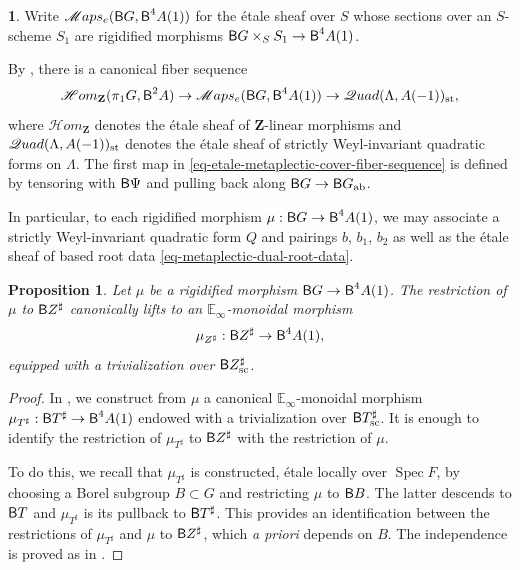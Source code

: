 \documentclass[10pt,english,reqno]{amsart}
\newcommand{\integers}{\mathbf Z}
\newcommand{\SMaps}{\mathscr{M}aps}
\newcommand{\SHom}{\mathscr{H}om}
\newcommand{\deloop}{\textnormal{\textsf{B}}}
\newcommand{\Spec}{\operatorname{Spec}}
\newcommand{\sconn}{\textnormal{sc}}
\newcommand{\abelian}{\textnormal{ab}}
\newcommand{\SQuad}{\mathscr{Q}uad}
\newcommand{\strict}{\textnormal{st}}
\newtheorem{prop}[subsubsection]{Proposition}
\theoremstyle{definition}
\numberwithin{equation}{section}
\newtheorem{untitledsubsubsection}[subsubsection]{}
\newenvironment{void}
{\begin{untitledsubsubsection}}
{\end{untitledsubsubsection}}
\begin{document}
\begin{void}
\label{void-etale-metaplectic-cover-fiber-sequence}
Write $\SMaps_e(\deloop G, \deloop^4A(1))$ for the \'etale sheaf over $S$ whose sections over an $S$-scheme $S_1$ are rigidified morphisms $\deloop G\times_S S_1 \rightarrow \deloop^4A(1)$.

By \cite[Proposition 5.1.11]{zhao2022metaplectic}, there is a canonical fiber sequence
\begin{equation}
\label{eq-etale-metaplectic-cover-fiber-sequence}
\SHom_{\integers}(\pi_1 G, \deloop^2 A) \rightarrow \SMaps_e(\deloop G, \deloop^4A(1)) \rightarrow \SQuad(\Lambda, A(-1))_{\strict},
\end{equation}
where $\SHom_{\integers}$ denotes the \'etale sheaf of $\integers$-linear morphisms and $\SQuad(\Lambda, A(-1))_{\strict}$ denotes the \'etale sheaf of strictly Weyl-invariant quadratic forms on $\Lambda$. The first map in \eqref{eq-etale-metaplectic-cover-fiber-sequence} is defined by tensoring with $\deloop\Psi$ and pulling back along $\deloop G \rightarrow \deloop G_{\abelian}$.

In particular, to each rigidified morphism $\mu : \deloop G \rightarrow \deloop^4A(1)$, we may associate a strictly Weyl-invariant quadratic form $Q$ and pairings $b$, $b_1$, $b_2$ as well as the \'etale sheaf of based root data \eqref{eq-metaplectic-dual-root-data}.
\end{void}


\begin{prop}
\label{prop-sharp-center-symmetric-monoidal}
Let $\mu$ be a rigidified morphism $\deloop G \rightarrow \deloop^4A(1)$. The restriction of $\mu$ to $\deloop Z^{\sharp}$ canonically lifts to an $\mathbb E_{\infty}$-monoidal morphism
\begin{equation}
\label{eq-sharp-center-symmetric-monoidal}
\mu_{Z^{\sharp}} : \deloop Z^{\sharp} \rightarrow \deloop^4A(1),
\end{equation}
equipped with a trivialization over $\deloop Z^{\sharp}_{\sconn}$.
\end{prop}
\begin{proof}
In \cite[\S6.1]{zhao2022metaplectic}, we construct from $\mu$ a canonical $\mathbb E_{\infty}$-monoidal morphism $\mu_{T^{\sharp}} : \deloop T^{\sharp} \rightarrow \deloop^4A(1)$ endowed with a trivialization over $\deloop T^{\sharp}_{\sconn}$. It is enough to identify the restriction of $\mu_{T^{\sharp}}$ to $\deloop Z^{\sharp}$ with the restriction of $\mu$.

To do this, we recall that $\mu_{T^{\sharp}}$ is constructed, \'etale locally over $\Spec F$, by choosing a Borel subgroup $B\subset G$ and restricting $\mu$ to $\deloop B$. The latter descends to $\deloop T$ and $\mu_{T^{\sharp}}$ is its pullback to $\deloop T^{\sharp}$. This provides an identification between the restrictions of $\mu_{T^{\sharp}}$ and $\mu$ to $\deloop Z^{\sharp}$, which \emph{a priori} depends on $B$. The independence is proved as in \cite[\S5.2.6]{zhao2022metaplectic}.
\end{proof}
\end{document}
